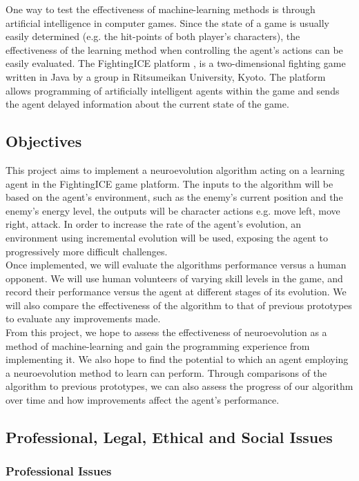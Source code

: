 \documentclass[11pt,a4paper]{article}
\begin{document}
One way to test the effectiveness of machine-learning methods is through artificial intelligence in computer games. Since the state of a game is usually easily determined (e.g. the hit-points of both player's characters), the effectiveness of the learning method when controlling the agent's actions can be easily evaluated. The FightingICE platform \cite{fightingice}, is a two-dimensional fighting game written in Java by a group in Ritsumeikan University, Kyoto. The platform allows programming of artificially intelligent agents within the game and sends the agent delayed information about the current state of the game. 
\newpage
\subsection{Objectives}
This project aims to implement a neuroevolution algorithm acting on a learning agent in the FightingICE game platform. The inputs to the algorithm will be based on the agent's environment, such as the enemy's current position and the enemy's energy level, the outputs will be character actions e.g. move left, move right, attack. In order to increase the rate of the agent's evolution, an environment using incremental evolution will be used, exposing the agent to progressively more difficult challenges.\\

Once implemented, we will evaluate the algorithms performance versus a human opponent. We will use human volunteers of varying skill levels in the game, and record their performance versus the agent at different stages of its evolution. We will also compare the effectiveness of the algorithm to that of previous prototypes to evaluate any improvements made.\\

From this project, we hope to assess the effectiveness of neuroevolution as a method of machine-learning and gain the programming experience from implementing it. We also hope to find the potential to which an agent employing a neuroevolution method to learn can perform. Through comparisons of the algorithm to previous prototypes, we can also assess the progress of our algorithm over time and how improvements affect the agent's performance.
\newpage
\subsection{Professional, Legal, Ethical and Social Issues}
\subsubsection{Professional Issues}
\end{document}
